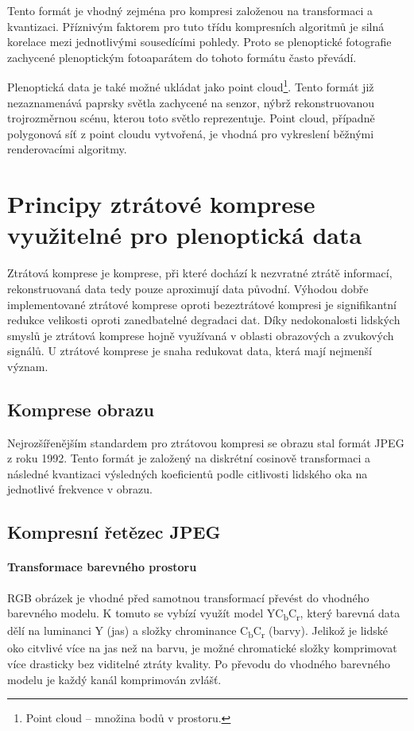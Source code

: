 Tento formát je vhodný zejména pro kompresi založenou na transformaci a kvantizaci.
Příznivým faktorem pro tuto třídu kompresních algoritmů je silná korelace mezi jednotlivými sousedícími pohledy.
Proto se plenoptické fotografie zachycené plenoptickým fotoaparátem do tohoto formátu často převádí.

Plenoptická data je také možné ukládat jako point cloud\footnote{Point cloud -- množina bodů v prostoru.}.
Tento formát již nezaznamenává paprsky světla zachycené na senzor, nýbrž rekonstruovanou trojrozměrnou scénu, kterou toto světlo reprezentuje.
Point cloud, případně polygonová síť z point cloudu vytvořená, je vhodná pro vykreslení běžnými renderovacími algoritmy.



\chapter{Principy ztrátové komprese využitelné pro plenoptická data}
\label{kompres-teo}
Ztrátová komprese je komprese, při které dochází k nezvratné ztrátě informací, rekonstruovaná data tedy pouze aproximují data původní.
Výhodou dobře implementované ztrátové komprese oproti bezeztrátové kompresi je signifikantní redukce velikosti oproti zanedbatelné degradaci dat.
Díky nedokonalosti lidských smyslů je ztrátová komprese hojně využívaná v oblasti obrazových a zvukových signálů.
U ztrátové komprese je snaha redukovat data, která mají nejmenší význam.

\section{Komprese obrazu}
Nejrozšířenějším standardem pro ztrátovou kompresi se obrazu stal formát JPEG z roku 1992.
Tento formát je založený na diskrétní cosinově transformaci a následné kvantizaci výsledných koeficientů podle citlivosti lidského oka na jednotlivé frekvence v obrazu.

\section{Kompresní řetězec JPEG}
\label{jpeg}

\subsubsection*{Transformace barevného prostoru}

RGB obrázek je vhodné před samotnou transformací převést do vhodného barevného modelu.
K tomuto se vybízí využít model YC\textsubscript{b}C\textsubscript{r}, který barevná data dělí na luminanci Y (jas) a složky chrominance C\textsubscript{b}C\textsubscript{r} (barvy).
Jelikož je lidské oko citvlivé více na jas než na barvu, je možné chromatické složky komprimovat více drasticky bez viditelné ztráty kvality.
Po převodu do vhodného barevného modelu je každý kanál komprimován zvlášť.

